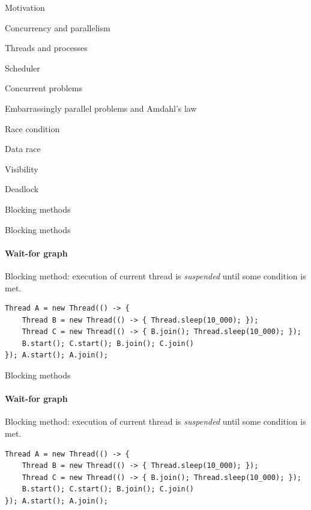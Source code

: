 \begin{section}{Motivation}
\begin{section}{Concurrency and parallelism}
\begin{section}{Threads and processes}
\begin{section}{Scheduler}
\begin{section}{Concurrent problems}
\begin{subsection}{Embarrassingly parallel problems and Amdahl's law}
\begin{subsection}{Race condition}
\begin{subsection}{Data race}
\begin{subsection}{Visibility}
\begin{subsection}{Deadlock}
\begin{frame}{Blocking methods}
\end{frame}

\begin{frame}{Blocking methods}
\framesubtitle{Wait-for graph}

Blocking method: execution of current thread is \textit{suspended} until some condition is met.

\begin{verbatim}
Thread A = new Thread(() -> { 
    Thread B = new Thread(() -> { Thread.sleep(10_000); });
    Thread C = new Thread(() -> { B.join(); Thread.sleep(10_000); });
    B.start(); C.start(); B.join(); C.join()
}); A.start(); A.join();
\end{verbatim}

\end{frame}

\begin{frame}{Blocking methods}
\framesubtitle{Wait-for graph}

Blocking method: execution of current thread is \textit{suspended} until some condition is met.

\begin{verbatim}
Thread A = new Thread(() -> { 
    Thread B = new Thread(() -> { Thread.sleep(10_000); });
    Thread C = new Thread(() -> { B.join(); Thread.sleep(10_000); });
    B.start(); C.start(); B.join(); C.join()
}); A.start(); A.join();
\end{verbatim}


\end{frame}
\end{subsection}
\end{subsection}
\end{subsection}
\end{subsection}
\end{subsection}
\end{section}
\end{section}
\end{section}
\end{section}
\end{section}

